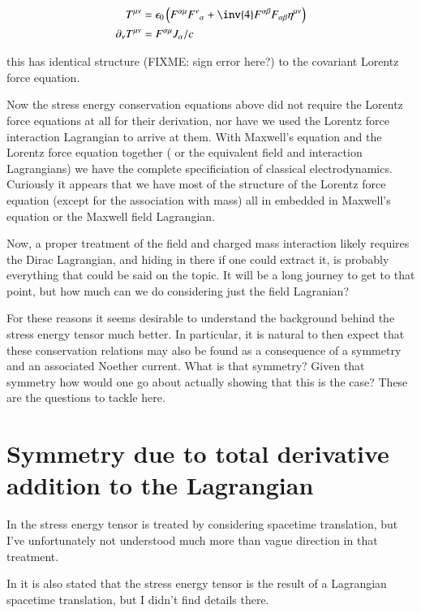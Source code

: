 \documentclass{article}
\begin{document}
\begin{align}
T^{\mu\nu} &= {\epsilon_0} \left( F^{\alpha\mu} {F^{\nu}}_{\alpha} + \inv{4} F^{\alpha\beta} F_{\alpha\beta} \eta^{\mu\nu} \right) \\
\partial_\nu T^{\mu\nu} &= F^{\alpha\mu} J_\alpha/c
\end{align}

this has identical structure (FIXME: sign error here?) to the
covariant Lorentz force equation.

Now the stress energy conservation equations above did not require
the Lorentz force equations at all for their derivation, nor have we
used the Lorentz force interaction Lagrangian to arrive at them.  
With Maxwell's equation and the Lorentz force equation together (
or the equivalent field and interaction Lagrangians) we have
the complete specificiation of classical electrodynamics.  Curiously
it
appears that we have most of the structure of the Lorentz force equation
(except for the association with mass) all in embedded in Maxwell's equation
or the Maxwell field Lagrangian.  

Now, a proper treatment of the field and charged mass interaction
likely requires the Dirac Lagrangian, and hiding in there if one
could extract it, is probably everything that could be said on the
topic.  It will be a long journey to get to that point, but how
much can we do considering just the field Lagranian?

For these reasons it seems desirable to
understand the background behind the stress energy tensor much better.
In particular, it is natural to then expect that these conservation
relations may also be found as a 
consequence of a symmetry and an associated Noether current.  What
is that symmetry?  Given that symmetry how would one go about
actually showing that this is the case?   These are the questions
to tackle here.

\section{ Symmetry due to total derivative addition to the Lagrangian }

In \cite{doran2003gap} the stress energy tensor is treated 
by considering spacetime translation, but I've unfortunately
not understood much more than vague direction in that treatment.

In \cite{srednicki2007qft} it is also stated that the stress energy tensor
is the result of a Lagrangian spacetime translation, but I didn't find
details there.
\end{document}
